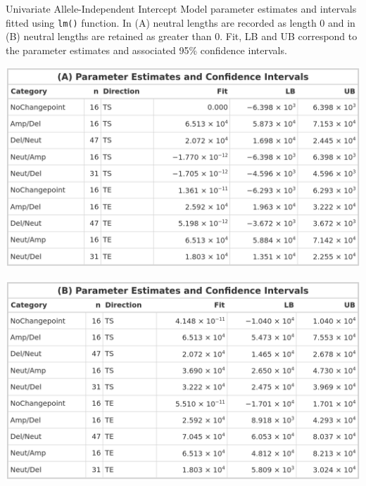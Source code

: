 \begin{table}[!htb]
    \caption[Univariate Allele-Independent Intercept Model parameter estimates and intervals fitted using \texttt{lm()} function.]{Univariate Allele-Independent Intercept Model parameter estimates and intervals fitted using \texttt{lm()} function. In (A) neutral lengths are recorded as length 0 and in (B) neutral lengths are retained as greater than 0. Fit, LB and UB correspond to the parameter estimates and associated 95\% confidence intervals. }
    \label{tbl:lm_uni_1_pred}
     \begin{subtable}[t]{.49\textwidth}
      \centering
      \includegraphics[width = 1\textwidth]{../tables/Chapter_5/Univariate_lm_7_AI_Pred.png}
    \end{subtable}%
    \hspace{0.5cm}
     \begin{subtable}[t]{.49\textwidth}
      \centering
         \includegraphics[width = 1\textwidth]{../tables/Chapter_5/Univariate_lm_7_Neut_AI_Pred.png}
    \end{subtable} 
\end{table}

